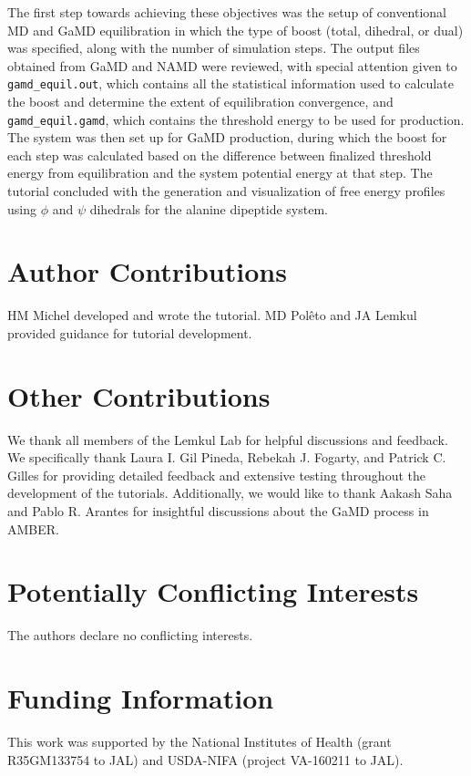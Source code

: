 \documentclass[9pt,tutorial]{livecoms}
\begin{document}
The first step towards achieving these objectives was the setup of conventional MD and GaMD equilibration in which the type of boost (total, dihedral, or dual) was specified, along with the number of simulation steps. The output files obtained from GaMD and NAMD were reviewed, with special attention given to \texttt{gamd\_equil.out}, which contains all the statistical information used to calculate the boost and determine the extent of equilibration convergence, and \texttt{gamd\_equil.gamd}, which contains the threshold energy to be used for production. The system was then set up for GaMD production, during which the boost for each step was calculated based on the difference between finalized threshold energy from equilibration and the system potential energy at that step. The tutorial concluded with the generation and visualization of free energy profiles using $\phi$ and $\psi$ dihedrals for the alanine dipeptide system.


\section{Author Contributions}
HM Michel developed and wrote the tutorial. MD Polêto and JA Lemkul provided guidance for tutorial development. 

\section{Other Contributions}
We thank all members of the Lemkul Lab for helpful discussions and feedback. We specifically thank Laura I. Gil Pineda, Rebekah J. Fogarty, and Patrick C. Gilles for providing detailed feedback and extensive testing throughout the development of the tutorials. Additionally, we would like to thank Aakash Saha and Pablo R. Arantes for insightful discussions about the GaMD process in AMBER.

\section{Potentially Conflicting Interests}

The authors declare no conflicting interests.

\section{Funding Information}

This work was supported by the National Institutes of Health (grant R35GM133754 to JAL) and USDA-NIFA (project VA-160211 to JAL).


\end{document}
